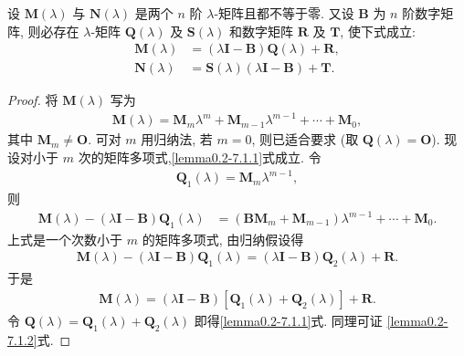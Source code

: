 \documentclass[../../main.tex]{subfiles}%
\begin{document}
\begin{lemma}\label{lemma:lambda-矩阵的性质1}
设 $\boldsymbol{M}(\lambda)$ 与 $\boldsymbol{N}(\lambda)$ 是两个 $n$ 阶 $\lambda$-矩阵且都不等于零. 又设 $\boldsymbol{B}$ 为 $n$ 阶数字矩阵, 则必存在 $\lambda$-矩阵 $\boldsymbol{Q}(\lambda)$ 及 $\boldsymbol{S}(\lambda)$ 和数字矩阵 $\boldsymbol{R}$ 及 $\boldsymbol{T}$, 使下式成立:
\begin{align}
\boldsymbol{M}(\lambda)&=(\lambda\boldsymbol{I}-\boldsymbol{B})\boldsymbol{Q}(\lambda)+\boldsymbol{R}, \label{lemma0.2-7.1.1}\\
\boldsymbol{N}(\lambda)&=\boldsymbol{S}(\lambda)(\lambda\boldsymbol{I}-\boldsymbol{B})+\boldsymbol{T}. \label{lemma0.2-7.1.2}
\end{align}
\end{lemma}
\begin{proof}
将 $\boldsymbol{M}(\lambda)$ 写为
\begin{align*}
\boldsymbol{M}(\lambda)=\boldsymbol{M}_m\lambda^m+\boldsymbol{M}_{m - 1}\lambda^{m - 1}+\cdots+\boldsymbol{M}_0,
\end{align*}
其中 $\boldsymbol{M}_m\neq\boldsymbol{O}$. 可对 $m$ 用归纳法, 若 $m = 0$, 则已适合要求 (取 $\boldsymbol{Q}(\lambda)=\boldsymbol{O}$). 现设对小于 $m$ 次的矩阵多项式,\eqref{lemma0.2-7.1.1}式成立. 令
\begin{align*}
\boldsymbol{Q}_1(\lambda)=\boldsymbol{M}_m\lambda^{m - 1},
\end{align*}
则
\begin{align}
\boldsymbol{M}(\lambda)-(\lambda\boldsymbol{I}-\boldsymbol{B})\boldsymbol{Q}_1(\lambda)&=(\boldsymbol{B}\boldsymbol{M}_m+\boldsymbol{M}_{m - 1})\lambda^{m - 1}+\cdots+\boldsymbol{M}_0. \label{lemma0.2-7.1.3}
\end{align}
上式是一个次数小于 $m$ 的矩阵多项式, 由归纳假设得
\begin{align*}
\boldsymbol{M}(\lambda)-(\lambda\boldsymbol{I}-\boldsymbol{B})\boldsymbol{Q}_1(\lambda)=(\lambda\boldsymbol{I}-\boldsymbol{B})\boldsymbol{Q}_2(\lambda)+\boldsymbol{R}.
\end{align*}
于是
\begin{align*}
\boldsymbol{M}(\lambda)=(\lambda\boldsymbol{I}-\boldsymbol{B})[\boldsymbol{Q}_1(\lambda)+\boldsymbol{Q}_2(\lambda)]+\boldsymbol{R}.
\end{align*}
令 $\boldsymbol{Q}(\lambda)=\boldsymbol{Q}_1(\lambda)+\boldsymbol{Q}_2(\lambda)$ 即得\eqref{lemma0.2-7.1.1}式. 同理可证 \eqref{lemma0.2-7.1.2}式. 
\end{proof}
\end{document}
